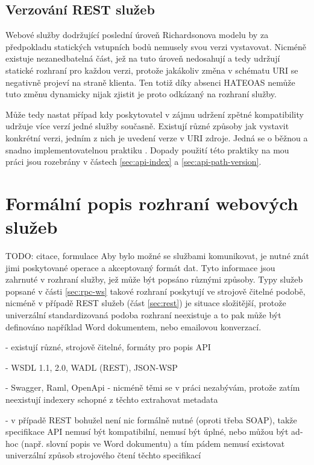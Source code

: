 \documentclass[czech,DP]{thesiskiv}
\begin{document}
\subsection{Verzování REST služeb}

Webové služby dodržující poslední úroveň Richardsonova modelu by za předpokladu statických vstupních bodů nemusely svou verzi vystavovat. Nicméně existuje nezanedbatelná část, jež na tuto úroveň nedosahují a tedy udržují statické rozhraní pro každou verzi, protože jakákoliv změna v schématu URI se negativně projeví na straně klienta. Ten totiž díky absenci HATEOAS nemůže tuto změnu dynamicky nijak zjistit je proto odkázaný na rozhraní služby. 

Může tedy nastat případ kdy poskytovatel v zájmu udržení zpětné kompatibility udržuje více verzí jedné služby současně. Existují různé způsoby jak vystavit konkrétní verzi, jedním z nich je uvedení verze v URI zdroje. Jedná se o běžnou a snadno implementovatelnou praktiku \cite{restApiVersion}\cite{restfulWebServices}. Dopady použití této praktiky na mou práci jsou rozebrány v částech \ref{sec:api-index} a \ref{sec:api-path-version}.


\section{Formální popis rozhraní webových služeb}

TODO: citace, formulace
Aby bylo možné se službami komunikovat, je nutné znát jimi poskytované operace a akceptovaný formát dat. Tyto informace jsou zahrnuté v rozhraní služby, jež může být popsáno různými způsoby. Typy služeb popsané v části \ref{sec:rpc-ws} takové rozhraní poskytují ve strojově čitelné podobě, nicméně v případě REST služeb (část \ref{sec:rest}) je situace složitější, protože univerzální standardizovaná podoba rozhraní neexistuje a to pak může být definováno například Word dokumentem, nebo emailovou konverzací.

- existují různé, strojově čitelné, formáty pro popis API

- WSDL 1.1, 2.0, WADL (REST), JSON-WSP

- Swagger, Raml, OpenApi
	- nicméně těmi se v práci nezabývám, protože zatím neexistují indexery schopné z těchto extrahovat metadata

- v případě REST bohužel není nic formálně nutné (oproti třeba SOAP), takže specifikace API nemusí být kompatibilní, nemusí být úplné, nebo můžou být ad-hoc (např. slovní popis ve Word dokumentu) a tím pádem nemusí existovat univerzální způsob strojového čtení těchto specifikací
\end{document}
